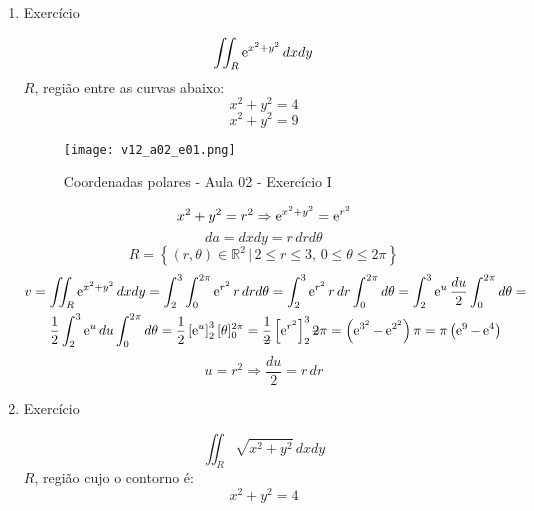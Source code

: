 \begin{enumerate}
	\item Exercício
	
	\begin{equation*}
		\iint_R \operatorname{e}^{x^2 + y^2} dx dy
	\end{equation*}
	$R$, região entre as curvas abaixo:
	\begin{equation*}
		x^2 + y^2 = 4
	\end{equation*}
	\begin{equation*}
		x^2 + y^2 = 9
	\end{equation*}
	
	\begin{figure}[htb]
		\caption{Coordenadas polares - Aula 02 - Exercício I}
		\label{v12_a02_e01}
		\centering
		\texttt{[image: v12\_a02\_e01.png]}		
	\end{figure}
	
	\begin{equation*}
		x^2 + y^2 = r^2\Rightarrow	\operatorname{e}^{x^2 + y^2} = \operatorname{e}^{r^2}
	\end{equation*}
	\begin{equation*}
		da = dx dy = r\, dr d\theta
	\end{equation*}
	\begin{equation*}
		R = \left\{(r, \theta) \in \mathbb{R}^2 \,|\, 2 \leq r \leq 3,\, 0 \leq \theta \leq 2\pi\right\}
	\end{equation*}		
	\begin{gather*}
		v = \iint_R \e^{x^2 + y^2} dx dy = \int_2^3 \int_0^{2\pi} \e^{r^2} r\, dr d\theta = \int_2^3 \e^{r^2} r\, dr \int_0^{2\pi} d\theta = \int_2^3 \e^u \dfrac{du}{2} \int_0^{2\pi} d\theta =\\ \dfrac{1}{2}\int_2^3 \e^u du \int_0^{2\pi} d\theta = \dfrac{1}{2} \left[\e^u\right]_2^3 [\theta]_0^{2\pi} = \dfrac{1}{\overstrike{2}} \left[\e^{r^2}\right]_2^3 \overstrike{2}\pi = \left(\e^{3^2} - \e^{2^2}\right) \pi = \pi\left(\e^9 - \e^4\right)	
	\end{gather*}
	\begin{equation*}
		u = r^2 \Rightarrow \dfrac{du}{2} = r\, dr
	\end{equation*}
	
	\item Exercício
	
	\begin{equation*}
		\iint_R \sqrt{x^2 + y^2}\, dxdy
	\end{equation*}
	$R$, região cujo o contorno é:
	\begin{equation*}
		x^2 + y^2 = 4
	\end{equation*}
	

\end{enumerate}
